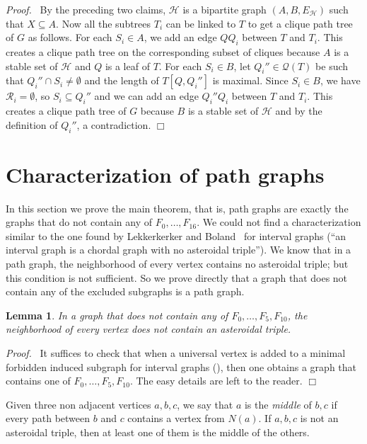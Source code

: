 \documentclass[11pt]{article}
\newtheorem{lemma}{Lemma}
\newenvironment{proof}{\noindent \emph{Proof.}\ }{\hfill
    $\Box$\vspace{1em}}
\begin{document}
\begin{proof}
By the preceding two claims, $\mathcal H$ is a bipartite graph $(A, B,
E_{\mathcal H})$ such that $X\subseteq A$.  Now all the subtrees $T_i$
can be linked to $T$ to get a clique path tree of $G$ as follows.  For
each $S_i\in A$, we add an edge $QQ_i$ between $T$ and $T_i$.  This
creates a clique path tree on the corresponding subset of cliques
because $A$ is a stable set of $\mathcal H$ and $Q$ is a leaf of $T$.
For each $S_i\in B$, let $Q_i''\in \mathcal Q(T)$ be such that
$Q_i''\cap S_i \neq \emptyset$ and the length of $T[Q, Q_i'']$ is
maximal.  Since $S_i\in B$, we have $\mathcal R_i=\emptyset$, so
$S_i\subseteq Q_i''$ and we can add an edge $Q_i''Q_i$ between $T$ and
$T_i$.  This creates a clique path tree of $G$ because $B$ is a stable
set of $\mathcal H$ and by the definition of $Q_i''$, a contradiction.
\end{proof}

\section{Characterization of path graphs}

In this section we prove the main theorem, that is, path graphs are
exactly the graphs that do not contain any of $F_0, \ldots, F_{16}$.
We could not find a characterization similar to the one found by
Lekkerkerker and Boland~\cite{LB62} for interval graphs (``an interval
graph is a chordal graph with no asteroidal triple'').  We know that
in a path graph, the neighborhood of every vertex contains no
asteroidal triple; but this condition is not sufficient.  So we prove
directly that a graph that does not contain any of the excluded
subgraphs is a path graph.

\begin{lemma}
\label{lem:PAT}
In a graph that does not contain any of $F_0, \ldots, F_5, F_{10}$,
the neighborhood of every vertex does not contain an asteroidal
triple.
\end{lemma}

\begin{proof}
    It suffices to check that when a universal vertex is added to a
    minimal forbidden induced subgraph for interval graphs
    (\cite{LB62}), then one obtains a graph that contains one of $F_0,
    \ldots, F_{5}, F_{10}$.  The easy details are left to the reader.
\end{proof}

Given three non adjacent vertices $a, b, c$, we say that $a$ is the
\emph{middle} of $b, c$ if every path between $b$ and $c$ contains a
vertex from $N(a)$.  If $a, b, c$ is not an asteroidal triple, then at
least one of them is the middle of the others.
\end{document}
